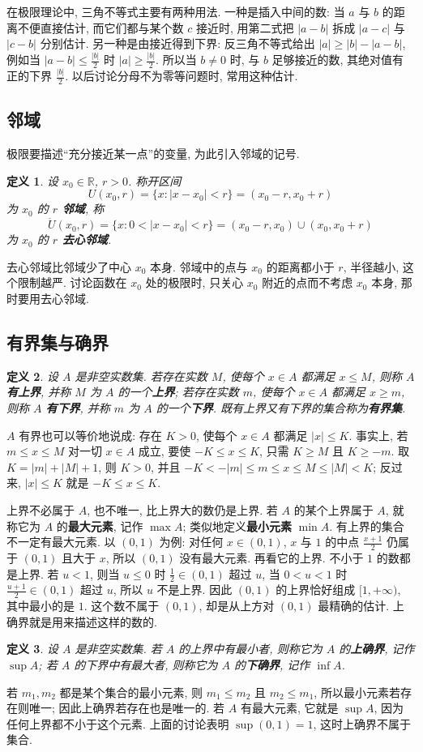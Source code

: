 \documentclass[UTF8,openany]{ctexbook}
\theoremstyle{chinesetextbook}
\newtheorem{definition}{定义}[section]
\begin{document}
在极限理论中, 三角不等式主要有两种用法. 一种是插入中间的数: 当 $a$ 与 $b$ 的距离不便直接估计, 而它们都与某个数 $c$ 接近时, 用第二式把 $|a-b|$ 拆成 $|a-c|$ 与 $|c-b|$ 分别估计. 另一种是由接近得到下界: 反三角不等式给出 $|a|\ge|b|-|a-b|$, 例如当 $\displaystyle|a-b|\le\frac{|b|}2$ 时 $\displaystyle|a|\ge\frac{|b|}2$. 所以当 $b\ne0$ 时, 与 $b$ 足够接近的数, 其绝对值有正的下界 $\displaystyle\frac{|b|}2$. 以后讨论分母不为零等问题时, 常用这种估计.
\subsection{邻域}
极限要描述“充分接近某一点”的变量, 为此引入邻域的记号.
\begin{definition}
设 $x_0\in\mathbb R$, $r>0$. 称开区间
\[
U(x_0,r)=\{x:|x-x_0|<r\}=(x_0-r,x_0+r)
\]
为 $x_0$ 的 \textbf{$r$ 邻域}, 称
\[
\mathring U(x_0,r)=\{x:0<|x-x_0|<r\}=(x_0-r,x_0)\cup(x_0,x_0+r)
\]
为 $x_0$ 的 \textbf{$r$ 去心邻域}.
\end{definition}
去心邻域比邻域少了中心 $x_0$ 本身. 邻域中的点与 $x_0$ 的距离都小于 $r$, 半径越小, 这个限制越严. 讨论函数在 $x_0$ 处的极限时, 只关心 $x_0$ 附近的点而不考虑 $x_0$ 本身, 那时要用去心邻域.
\subsection{有界集与确界}
\begin{definition}
设 $A$ 是非空实数集. 若存在实数 $M$, 使每个 $x\in A$ 都满足 $x\le M$, 则称 $A$ \textbf{有上界}, 并称 $M$ 为 $A$ 的一个\textbf{上界}; 若存在实数 $m$, 使每个 $x\in A$ 都满足 $x\ge m$, 则称 $A$ \textbf{有下界}, 并称 $m$ 为 $A$ 的一个\textbf{下界}. 既有上界又有下界的集合称为\textbf{有界集}.
\end{definition}
$A$ 有界也可以等价地说成: 存在 $K>0$, 使每个 $x\in A$ 都满足 $|x|\le K$. 事实上, 若 $m\le x\le M$ 对一切 $x\in A$ 成立, 要使 $-K\le x\le K$, 只需 $K\ge M$ 且 $K\ge-m$. 取 $K=|m|+|M|+1$, 则 $K>0$, 并且 $-K<-|m|\le m\le x\le M\le|M|<K$; 反过来, $|x|\le K$ 就是 $-K\le x\le K$.

上界不必属于 $A$, 也不唯一, 比上界大的数仍是上界. 若 $A$ 的某个上界属于 $A$, 就称它为 $A$ 的\textbf{最大元素}, 记作 $\max A$; 类似地定义\textbf{最小元素} $\min A$. 有上界的集合不一定有最大元素. 以 $(0,1)$ 为例: 对任何 $x\in(0,1)$, $x$ 与 $1$ 的中点 $\displaystyle\frac{x+1}2$ 仍属于 $(0,1)$ 且大于 $x$, 所以 $(0,1)$ 没有最大元素. 再看它的上界. 不小于 $1$ 的数都是上界. 若 $u<1$, 则当 $u\le0$ 时 $\displaystyle\frac12\in(0,1)$ 超过 $u$, 当 $0<u<1$ 时 $\displaystyle\frac{u+1}2\in(0,1)$ 超过 $u$, 所以 $u$ 不是上界. 因此 $(0,1)$ 的上界恰好组成 $[1,+\infty)$, 其中最小的是 $1$. 这个数不属于 $(0,1)$, 却是从上方对 $(0,1)$ 最精确的估计. 上确界就是用来描述这样的数的.
\begin{definition}
设 $A$ 是非空实数集. 若 $A$ 的上界中有最小者, 则称它为 $A$ 的\textbf{上确界}, 记作 $\sup A$; 若 $A$ 的下界中有最大者, 则称它为 $A$ 的\textbf{下确界}, 记作 $\inf A$.
\end{definition}
若 $m_1,m_2$ 都是某个集合的最小元素, 则 $m_1\le m_2$ 且 $m_2\le m_1$, 所以最小元素若存在则唯一; 因此上确界若存在也是唯一的. 若 $A$ 有最大元素, 它就是 $\sup A$, 因为任何上界都不小于这个元素. 上面的讨论表明 $\sup(0,1)=1$, 这时上确界不属于集合.
\end{document}

